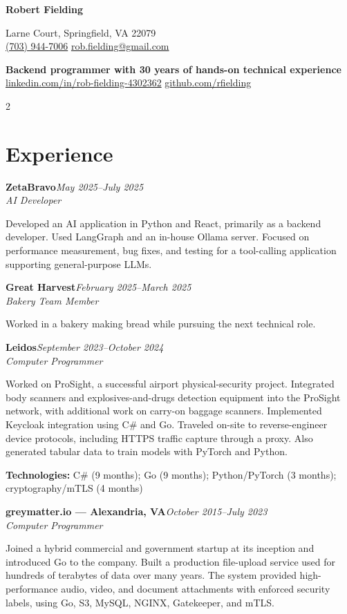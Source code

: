 \documentclass[10pt,letterpaper]{article}
\newcommand{\role}[3]{%
  \textbf{#1}\hfill\textit{#2}\\[-1pt]
  \textit{#3}\par
}
\newcommand{\tech}[1]{\small\textbf{Technologies:} #1\normalsize}
\begin{document}
{\Huge\bfseries Robert Fielding}\hfill
\begin{minipage}[t]{0.39\textwidth} Larne Court, Springfield, VA 22079\\
\href{tel:+17039447006}{(703) 944-7006} \quad
\href{mailto:rob.fielding@gmail.com}{rob.fielding@gmail.com}
\end{minipage}

\vspace{3pt}
\textbf{Backend programmer with 30 years of hands-on technical experience}\\
\href{https://www.linkedin.com/in/rob-fielding-4302362/}{linkedin.com/in/rob-fielding-4302362} \quad
\href{https://github.com/rfielding}{github.com/rfielding}

\begin{paracol}{2}

\section*{Experience}

\role{ZetaBravo}{May 2025--July 2025}{AI Developer}
Developed an AI application in Python and React, primarily as a backend developer. Used LangGraph and an in-house Ollama server. Focused on performance measurement, bug fixes, and testing for a tool-calling application supporting general-purpose LLMs.

\role{Great Harvest}{February 2025--March 2025}{Bakery Team Member}
Worked in a bakery making bread while pursuing the next technical role.

\role{Leidos}{September 2023--October 2024}{Computer Programmer}
Worked on ProSight, a successful airport physical-security project. Integrated body scanners and explosives-and-drugs detection equipment into the ProSight network, with additional work on carry-on baggage scanners. Implemented Keycloak integration using C\# and Go. Traveled on-site to reverse-engineer device protocols, including HTTPS traffic capture through a proxy. Also generated tabular data to train models with PyTorch and Python.

\tech{C\# (9 months); Go (9 months); Python/PyTorch (3 months); cryptography/mTLS (4 months)}

\role{greymatter.io --- Alexandria, VA}{October 2015--July 2023}{Computer Programmer}
Joined a hybrid commercial and government startup at its inception and introduced Go to the company. Built a production file-upload service used for hundreds of terabytes of data over many years. The system provided high-performance audio, video, and document attachments with enforced security labels, using Go, S3, MySQL, NGINX, Gatekeeper, and mTLS.


\end{paracol}
\end{document}
